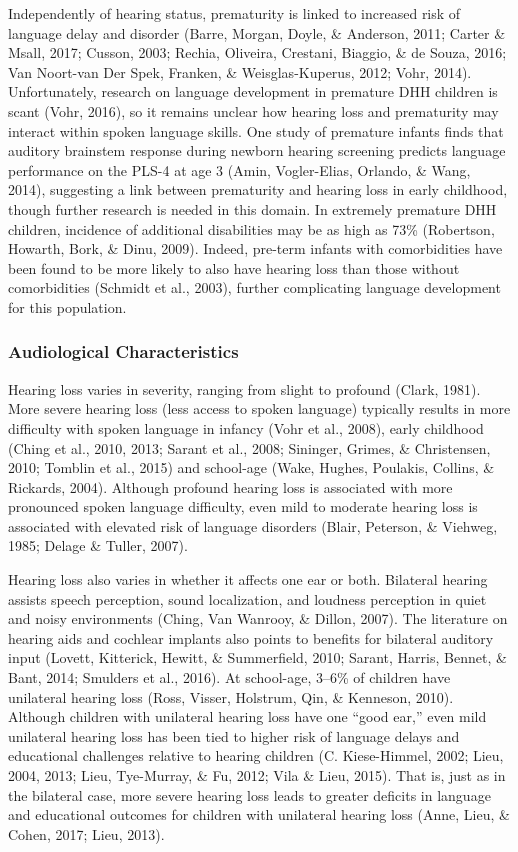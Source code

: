 \documentclass[english,man]{apa6}
\begin{document}
Independently of hearing status, prematurity is linked to increased risk of language delay and disorder (Barre, Morgan, Doyle, \& Anderson, 2011; Carter \& Msall, 2017; Cusson, 2003; Rechia, Oliveira, Crestani, Biaggio, \& de Souza, 2016; Van Noort-van Der Spek, Franken, \& Weisglas-Kuperus, 2012; Vohr, 2014). Unfortunately, research on language development in premature DHH children is scant (Vohr, 2016), so it remains unclear how hearing loss and prematurity may interact within spoken language skills. One study of premature infants finds that auditory brainstem response during newborn hearing screening predicts language performance on the PLS-4 at age 3 (Amin, Vogler-Elias, Orlando, \& Wang, 2014), suggesting a link between prematurity and hearing loss in early childhood, though further research is needed in this domain. In extremely premature DHH children, incidence of additional disabilities may be as high as 73\% (Robertson, Howarth, Bork, \& Dinu, 2009). Indeed, pre-term infants with comorbidities have been found to be more likely to also have hearing loss than those without comorbidities (Schmidt et al., 2003), further complicating language development for this population.

\hypertarget{audiological-characteristics}{%
\subsubsection{Audiological Characteristics}\label{audiological-characteristics}}

Hearing loss varies in severity, ranging from slight to profound (Clark, 1981). More severe hearing loss (less access to spoken language) typically results in more difficulty with spoken language in infancy (Vohr et al., 2008), early childhood (Ching et al., 2010, 2013; Sarant et al., 2008; Sininger, Grimes, \& Christensen, 2010; Tomblin et al., 2015) and school-age (Wake, Hughes, Poulakis, Collins, \& Rickards, 2004). Although profound hearing loss is associated with more pronounced spoken language difficulty, even mild to moderate hearing loss is associated with elevated risk of language disorders (Blair, Peterson, \& Viehweg, 1985; Delage \& Tuller, 2007).

Hearing loss also varies in whether it affects one ear or both. Bilateral hearing assists speech perception, sound localization, and loudness perception in quiet and noisy environments (Ching, Van Wanrooy, \& Dillon, 2007). The literature on hearing aids and cochlear implants also points to benefits for bilateral auditory input (Lovett, Kitterick, Hewitt, \& Summerfield, 2010; Sarant, Harris, Bennet, \& Bant, 2014; Smulders et al., 2016). At school-age, 3--6\% of children have unilateral hearing loss (Ross, Visser, Holstrum, Qin, \& Kenneson, 2010). Although children with unilateral hearing loss have one \enquote{good ear,} even mild unilateral hearing loss has been tied to higher risk of language delays and educational challenges relative to hearing children (C. Kiese-Himmel, 2002; Lieu, 2004, 2013; Lieu, Tye-Murray, \& Fu, 2012; Vila \& Lieu, 2015). That is, just as in the bilateral case, more severe hearing loss leads to greater deficits in language and educational outcomes for children with unilateral hearing loss (Anne, Lieu, \& Cohen, 2017; Lieu, 2013).
\end{document}

